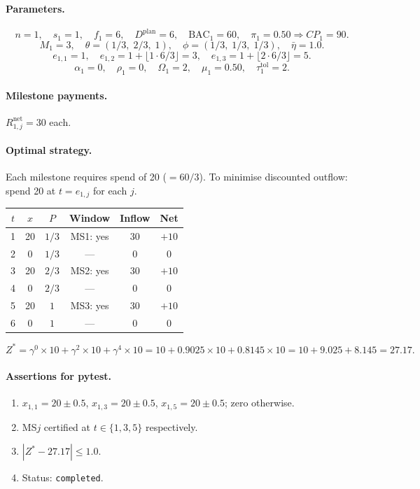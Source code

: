 \documentclass[11pt, a4paper]{article}
\newcommand{\BAC}{\mathrm{BAC}}
\begin{document}
\paragraph{Parameters.}
\[
  n=1,\quad s_1=1,\quad f_1=6,\quad D^{\mathrm{plan}}=6,\quad
  \BAC_1=60,\quad\pi_1=0.50\Rightarrow CP_1=90.
\]
\[
  M_1=3,\quad\theta=(1/3,\;2/3,\;1),\quad\phi=(1/3,\;1/3,\;1/3),\quad
  \bar\eta=1.0.
\]
\[
  e_{1,1}=1,\quad e_{1,2}=1+\lfloor1\cdot6/3\rfloor=3,\quad
  e_{1,3}=1+\lfloor2\cdot6/3\rfloor=5.
\]
\[
  \alpha_1=0,\quad\rho_1=0,\quad\Omega_1=2,\quad\mu_1=0.50,\quad
  \tau_1^{\mathrm{tol}}=2.
\]

\paragraph{Milestone payments.} $R_{1,j}^{\mathrm{net}}=30$ each.

\paragraph{Optimal strategy.}
Each milestone requires spend of 20 ($=60/3$).
To minimise discounted outflow: spend 20 at $t=e_{1,j}$ for each $j$.

\begin{center}
\begin{tabular}{cccccc}
\toprule
$t$ & $x$ & $P$ & Window & Inflow & Net\\
\midrule
1 & 20 & $1/3$ & MS1: yes & 30 & $+10$\\
2 &  0 & $1/3$ & ---      &  0 & $0$\\
3 & 20 & $2/3$ & MS2: yes & 30 & $+10$\\
4 &  0 & $2/3$ & ---      &  0 & $0$\\
5 & 20 & $1$   & MS3: yes & 30 & $+10$\\
6 &  0 & $1$   & ---      &  0 & $0$\\
\bottomrule
\end{tabular}
\end{center}

\[
  Z^* = \gamma^0\times10 + \gamma^2\times10 + \gamma^4\times10
      = 10 + 0.9025\times10 + 0.8145\times10
      = 10 + 9.025 + 8.145 = \mathbf{27.17}.
\]

\paragraph{Assertions for pytest.}
\begin{enumerate}[label=A\arabic*.]
  \item $x_{1,1}=20\pm0.5$, $x_{1,3}=20\pm0.5$, $x_{1,5}=20\pm0.5$;
    zero otherwise.
  \item MS$j$ certified at $t\in\{1,3,5\}$ respectively.
  \item $|Z^*-27.17|\leq1.0$.
  \item Status: \texttt{completed}.
\end{enumerate}
\end{document}
